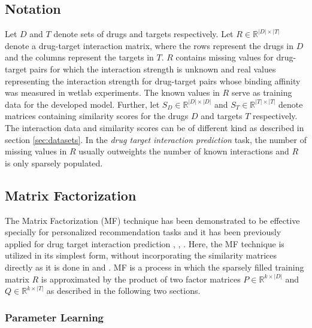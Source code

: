 \subsection{Notation}
\label{sec:Notation}
Let $D$ and $T$ denote sets of drugs and targets respectively. Let $R \in \mathbb{R} ^{|D| \times |T|}$ denote a drug-target interaction matrix, where the rows represent the drugs in $D$ and the columns represent the targets in $T$. $R$ contains missing values for drug-target pairs for which the interaction strength is unknown and real values representing the interaction strength for drug-target pairs whose binding affinity was measured in wetlab experiments. The known values in $R$ serve as training data for the developed model. Further, let $S_D \in \mathbb{R}^{|D| \times |D|}$ and $S_T \in \mathbb{R}^{|T| \times |T|}$ denote matrices containing similarity scores for the drugs $D$ and targets $T$ respectively. The interaction data and similarity scores can be of different kind as described in section \ref{sec:datasets}.  In the \textit{drug target interaction prediction} task, the number of missing values in $R$ usually outweights the number of known interactions and $R$ is only sparsely populated.

\subsection{Matrix Factorization}
\label{sec:MF}
The Matrix Factorization (MF) technique has been demonstrated to be effective specially for personalized recommendation tasks \cite{Koren:2009:MFT:1608565.1608614} and it has been previously applied for drug target interaction prediction \cite{liu2016neighborhood}, \cite{ezzat2016drug}, \cite{gonen2013kernelized}. Here, the MF technique is utilized in its simplest form, without incorporating the similarity matrices directly as it is done in \cite{liu2016neighborhood} and \cite{gonen2013kernelized}. MF is a process in which the sparsely filled training matrix $R$ is approximated by the product of two factor matrices $P \in \mathbb{R}^{k\times |D|}$ and $Q \in \mathbb{R}^{k\times |T|}$ as described in the following two sections.

\subsubsection{Parameter Learning}

